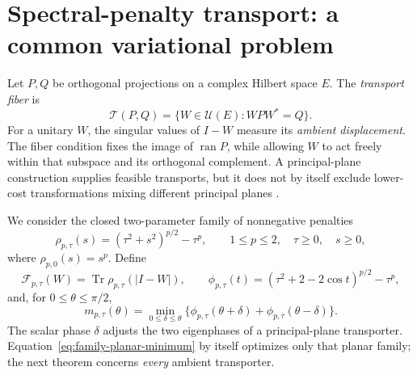 \section{Spectral-penalty transport: a common variational problem}
\label{sec:unified-transport}

Let $P,Q$ be orthogonal projections on a complex Hilbert space $E$.
The \emph{transport fiber} is
\begin{equation}
 \mathcal T(P,Q)=\{W\in\mathcal U(E):WPW^*=Q\}.
 \label{eq:transport-fiber}
\end{equation}
For a unitary $W$, the singular values of $I-W$ measure its
\emph{ambient displacement}.  The fiber condition fixes the image of
$\operatorname{ran}P$, while allowing $W$ to act freely within that subspace
and its orthogonal complement.  A principal-plane construction supplies
feasible transports, but it does not by itself exclude lower-cost
transformations mixing different principal planes
\citep{davis1958separation,davis1970rotation,bolotnikov2001minimal}.

We consider the closed two-parameter family of nonnegative penalties
\begin{equation}
 \rho_{p,\tau}(s)
   =(\tau^2+s^2)^{p/2}-\tau^p,
 \qquad 1\le p\le2,\quad \tau\ge0,\quad s\ge0,
 \label{eq:family-rho}
\end{equation}
where $\rho_{p,0}(s)=s^p$.  Define
\begin{equation}
 \mathcal F_{p,\tau}(W)=
    \operatorname{Tr}\rho_{p,\tau}(|I-W|),\qquad
 \phi_{p,\tau}(t)=(\tau^2+2-2\cos t)^{p/2}-\tau^p,
 \label{eq:family-objective}
\end{equation}
and, for $0\le\theta\le\pi/2$,
\begin{equation}
 m_{p,\tau}(\theta)=
 \min_{0\le\delta\le\theta}\bigl\{
      \phi_{p,\tau}(\theta+\delta)
     +\phi_{p,\tau}(\theta-\delta)\bigr\}.
 \label{eq:family-planar-minimum}
\end{equation}
The scalar phase $\delta$ adjusts the two eigenphases of a
principal-plane transporter.  Equation~\eqref{eq:family-planar-minimum}
by itself optimizes only that planar family; the next theorem concerns
\emph{every} ambient transporter.

